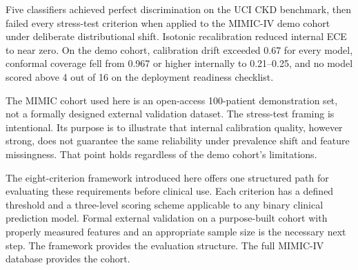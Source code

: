 Five classifiers achieved perfect discrimination on the UCI CKD benchmark, then failed every stress-test criterion when applied to the MIMIC-IV demo cohort under deliberate distributional shift. Isotonic recalibration reduced internal ECE to near zero. On the demo cohort, calibration drift exceeded 0.67 for every model, conformal coverage fell from 0.967 or higher internally to 0.21--0.25, and no model scored above 4 out of 16 on the deployment readiness checklist.

The MIMIC cohort used here is an open-access 100-patient demonstration set, not a formally designed external validation dataset. The stress-test framing is intentional. Its purpose is to illustrate that internal calibration quality, however strong, does not guarantee the same reliability under prevalence shift and feature missingness. That point holds regardless of the demo cohort's limitations.

The eight-criterion framework introduced here offers one structured path for evaluating these requirements before clinical use. Each criterion has a defined threshold and a three-level scoring scheme applicable to any binary clinical prediction model. Formal external validation on a purpose-built cohort with properly measured features and an appropriate sample size is the necessary next step. The framework provides the evaluation structure. The full MIMIC-IV database provides the cohort.
